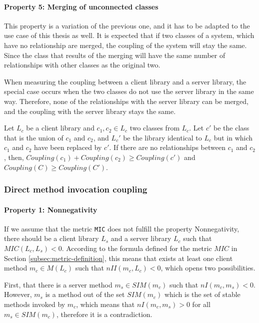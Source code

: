 \paragraph{Property 5: Merging of unconnected classes}
This property is a variation of the previous one, and it has to be adapted to the use case of this thesis as well. It is expected that if two classes of a system, which have no relationship are merged, the coupling of the system will stay the same. Since the class that results of the merging will have the same number of relationships with other classes as the original two.

When measuring the coupling between a client library and a server library, the special case occurs when the two classes do not use the server library in the same way. Therefore, none of the relationships with the server library can be merged, and the coupling with the server library stays the same.

Let $L_c$ be a client library and $c_1, c_2 \in L_c$ two classes from $L_c$. Let $c'$ be the class that is the union of  $c_1$ and $c_2$, and $L_c'$ be the library identical to $L_c$ but in which $c_1$ and $c_2$ have been replaced by $c'$. If there are no relationships between $c_1$ and $c_2$, then, $Coupling(c_1) + Coupling(c_2) \ge Coupling(c')$ and $Coupling(C) \ge Coupling(C')$.

\subsubsection{Direct method invocation coupling}

\paragraph{Property 1: Nonnegativity}
If we assume that the metric \texttt{MIC} does not fulfill the property Nonnegativity, there should be a client library $L_s$ and a server library $L_c$ such that $MIC(L_c, L_s) < 0$.
According to the formula defined for the metric $MIC$ in Section \ref{subsec:metric-definition}, this means that exists at least one client method $m_c \in M(L_c)$ such that $nII(m_c, L_c) < 0$, which opens two possibilities.

First, that there is a server method $m_s \in SIM(m_c)$ such that $nI(m_c, m_s) < 0$. However, $m_s$ is a method out of the set $SIM(m_c)$ which is the set of stable methods invoked by $m_c$, which means that $nI(m_c, m_s) > 0$ for all $m_s \in SIM(m_c)$, therefore it is a contradiction.

